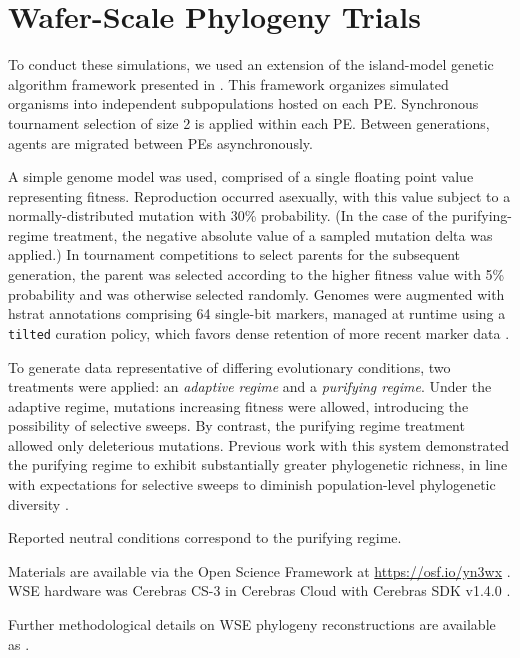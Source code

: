 \section{Wafer-Scale Phylogeny Trials}


To conduct these simulations, we used an extension of the island-model genetic algorithm framework presented in \cite{moreno2024trackable}.
This framework organizes simulated organisms into independent subpopulations hosted on each PE.
Synchronous tournament selection of size 2 is applied within each PE.
Between generations, agents are migrated between PEs asynchronously.


A simple genome model was used, comprised of a single floating point value representing fitness.
Reproduction occurred asexually, with this value subject to a normally-distributed mutation with 30\% probability.
(In the case of the purifying-regime treatment, the negative absolute value of a sampled mutation delta was applied.)
In tournament competitions to select parents for the subsequent generation, the parent was selected according to the higher fitness value with 5\% probability and was otherwise selected randomly.
Genomes were augmented with hstrat annotations comprising 64 single-bit markers, managed at runtime using a \texttt{tilted} curation policy, which favors dense retention of more recent marker data \cite{moreno2024algorithms}.

To generate data representative of differing evolutionary conditions, two treatments were applied: an \textit{adaptive regime} and a \textit{purifying regime}.
Under the adaptive regime, mutations increasing fitness were allowed, introducing the possibility of selective sweeps.
By contrast, the purifying regime treatment allowed only deleterious mutations.
Previous work with this system demonstrated the purifying regime to exhibit substantially greater phylogenetic richness, in line with expectations for selective sweeps to diminish population-level phylogenetic diversity \cite{moreno2024trackable}.

Reported neutral conditions correspond to the purifying regime.

Materials are available via the Open Science Framework at \url{https://osf.io/yn3wx} \cite{foster2017open}.
WSE hardware was Cerebras CS-3 in Cerebras Cloud with Cerebras SDK v1.4.0 \cite{buitrago2021neocortex}.

Further methodological details on WSE phylogeny reconstructions are available as \cite{singhvi2025scalable}.
